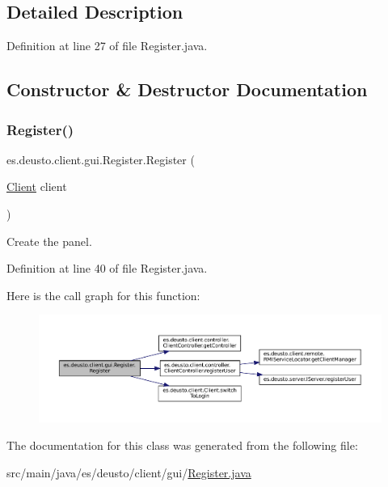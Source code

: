 \subsection{Detailed Description}


Definition at line 27 of file Register.\+java.



\subsection{Constructor \& Destructor Documentation}
\mbox{\label{classes_1_1deusto_1_1client_1_1gui_1_1_register_a5b463722d846413a2b1e929207c0f20d}} 
\subsubsection{\texorpdfstring{Register()}{Register()}}
{\footnotesize\ttfamily es.\+deusto.\+client.\+gui.\+Register.\+Register (\begin{DoxyParamCaption}\item[{\mbox{\hyperlink{classes_1_1deusto_1_1client_1_1_client}{Client}}}]{client }\end{DoxyParamCaption})}

Create the panel. 

Definition at line 40 of file Register.\+java.

Here is the call graph for this function\+:
\nopagebreak
\begin{figure}[H]
\begin{center}
\leavevmode
\includegraphics[width=350pt]{classes_1_1deusto_1_1client_1_1gui_1_1_register_a5b463722d846413a2b1e929207c0f20d_cgraph}
\end{center}
\end{figure}


The documentation for this class was generated from the following file\+:\begin{DoxyCompactItemize}
\item 
src/main/java/es/deusto/client/gui/\mbox{\hyperlink{_register_8java}{Register.\+java}}\end{DoxyCompactItemize}
